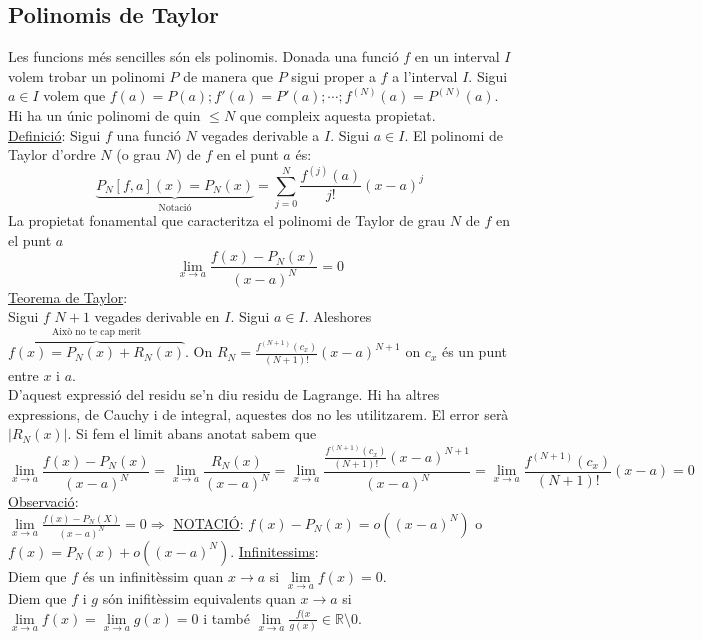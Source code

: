 \documentclass[../main.tex]{subfiles}
\begin{document}
    \subsection{Polinomis de Taylor}
    Les funcions més sencilles són els polinomis. Donada una funció $f$ en un interval $I$ volem trobar un polinomi $P$ de manera que $P$ sigui proper a $f$ a l'interval $I$. Sigui $a \in I$ volem que $f(a) = P(a); f'(a) = P'(a); \dotsb; f^{(N)}(a) = P^{(N)}(a)$. Hi ha un únic polinomi de quin $\leq N$ que compleix aquesta propietat.\\
    \underline{Definició}: Sigui $f$ una funció $N$ vegades derivable a $I$. Sigui $a \in I$. El polinomi de Taylor d'ordre $N$ (o grau $N$) de $f$ en el punt $a$ és:
    \begin{displaymath}
        \underbrace{P_N[f, a](x) = P_N(x)}_\text{Notació} = \sum\limits_{j = 0}^N \frac{f^{(j)}(a)}{j!}(x-a)^j
    \end{displaymath}
    La propietat fonamental que caracteritza el polinomi de Taylor de grau $N$ de $f$ en el punt $a$
    \begin{displaymath}
        \lim_{x \rightarrow a}\frac{f(x)-P_N(x)}{(x-a)^N} = 0
    \end{displaymath}
    \underline{Teorema de Taylor}:\\
    Sigui $f$ $N+1$ vegades derivable en $I$. Sigui $a \in I$. Aleshores $\overbrace{f(x) = P_N(x) + R_N(x)}^\text{Això no te cap merit}$. On $R_N = \frac{f^{(N+1)}(c_x)}{(N+1)!}(x-a)^{N+1}$ on $c_x$ és un punt entre $x$ i $a$.\\
    D'aquest expressió del residu se'n diu residu de Lagrange. Hi ha altres expressions, de Cauchy i de integral, aquestes dos no les utilitzarem. El error serà $|R_N(x)|$. Si fem el limit abans anotat sabem que
    \begin{displaymath}
        \lim_{x \rightarrow a}\frac{f(x)-P_N(x)}{(x-a)^N} = \lim_{x \rightarrow a}\frac{R_N(x)}{(x-a)^N} = \lim_{x \rightarrow a}\frac{\frac{f^{(N+1)}(c_x)}{(N+1)!}(x-a)^{N+1}}{(x-a)^N} = \lim_{x \rightarrow a} \frac{f^{(N+1)}(c_x)}{(N+1)!}(x-a) = 0
    \end{displaymath}
    \underline{Observació}:\\
    $\lim\limits_{x \rightarrow a} \frac{f(x)-P_N(X)}{(x-a)^N} = 0 \Rightarrow$ \underline{NOTACIÓ}: $f(x) - P_N(x) = o((x-a)^N)$ o $f(x) = P_N(x) + o((x-a)^N)$.
    \underline{Infinitessims}:\\
    Diem que $f$ és un infinitèssim quan $x \rightarrow a$ si $\lim\limits_{x \rightarrow a} f(x) = 0$.\\
    Diem que $f$ i $g$ són inifitèssim equivalents quan $x \rightarrow a$ si $\lim\limits_{x \rightarrow a} f(x) = \lim\limits_{x \rightarrow a} g(x) = 0$ i també $\lim\limits_{x \rightarrow a} \frac{f(x}{g(x)} \in \mathbb{R} \setminus 0$.
\end{document}

